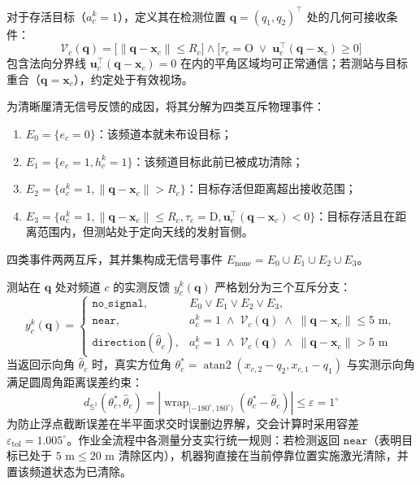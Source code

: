 \documentclass[zihao=-4,a4paper,UTF8]{ctexart}
\begin{document}
对于存活目标（$a_c^k = 1$），定义其在检测位置 $\mathbf{q} = (q_1, q_2)^\top$ 处的几何可接收条件：
\begin{equation}
    \mathcal{V}_c(\mathbf{q}) = \Big[ \|\mathbf{q} - \mathbf{x}_c\| \le R_{c} \Big] \land \Big[ \tau_c = \mathrm{O} \;\lor\; \mathbf{u}_c^\top (\mathbf{q} - \mathbf{x}_c) \ge 0 \Big]
\end{equation}
包含法向分界线 $\mathbf{u}_c^\top (\mathbf{q} - \mathbf{x}_c) = 0$ 在内的平角区域均可正常通信；若测站与目标重合（$\mathbf{q} = \mathbf{x}_c$），约定处于有效视场。

为清晰厘清无信号反馈的成因，将其分解为四类互斥物理事件：
\begin{enumerate}[leftmargin=2.2em, itemsep=0.02em, topsep=0.02em]
    \item $E_0 = \{e_c = 0\}$：该频道本就未布设目标；
    \item $E_1 = \{e_c = 1, h_c^k = 1\}$：该频道目标此前已被成功清除；
    \item $E_2 = \{a_c^k = 1, \|\mathbf{q} - \mathbf{x}_c\| > R_c\}$：目标存活但距离超出接收范围；
    \item $E_3 = \{a_c^k = 1, \|\mathbf{q} - \mathbf{x}_c\| \le R_c, \tau_c = \mathrm{D}, \mathbf{u}_c^\top (\mathbf{q} - \mathbf{x}_c) < 0\}$：目标存活且在距离范围内，但测站处于定向天线的发射盲侧。
\end{enumerate}
四类事件两两互斥，其并集构成无信号事件 $E_{\mathrm{none}} = E_0 \cup E_1 \cup E_2 \cup E_3$。

测站在 $\mathbf{q}$ 处对频道 $c$ 的实测反馈 $y_c^k(\mathbf{q})$ 严格划分为三个互斥分支：
\begin{equation}
    y_c^k(\mathbf{q}) = \begin{cases}
        \texttt{no\_signal}, & E_0 \lor E_1 \lor E_2 \lor E_3, \\
        \texttt{near}, & a_c^k = 1 \;\land\; \mathcal{V}_c(\mathbf{q}) \;\land\; \|\mathbf{q} - \mathbf{x}_c\| \le 5\text{ m}, \\
        \texttt{direction}(\hat{\theta}_c), & a_c^k = 1 \;\land\; \mathcal{V}_c(\mathbf{q}) \;\land\; \|\mathbf{q} - \mathbf{x}_c\| > 5\text{ m}
    \end{cases}
\end{equation}
当返回示向角 $\hat{\theta}_c$ 时，真实方位角 $\theta_c^\ast = \operatorname{atan2}(x_{c,2} - q_2, x_{c,1} - q_1)$ 与实测示向角满足圆周角距离误差约束：
\begin{equation}
    d_{\mathbb{S}^1}(\theta_c^\ast, \hat{\theta}_c) = |\operatorname{wrap}_{[-180^\circ, 180^\circ)}(\theta_c^\ast - \hat{\theta}_c)| \le \varepsilon = 1^\circ
\end{equation}
为防止浮点截断误差在半平面求交时误删边界解，交会计算时采用容差 $\varepsilon_{\mathrm{tol}} = 1.005^\circ$。作业全流程中各测量分支实行统一规则：若检测返回 $\texttt{near}$（表明目标已处于 $5\text{ m} \le 20\text{ m}$ 清除区内），机器狗直接在当前停靠位置实施激光清除，并置该频道状态为已清除。
\end{document}
